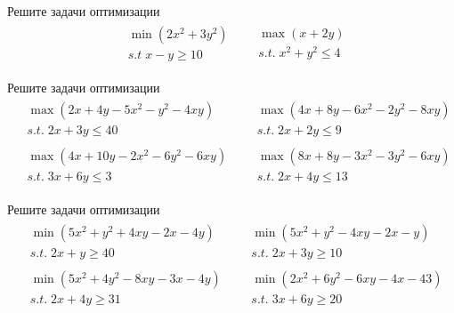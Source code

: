 
\begin{exercise}
Решите задачи оптимизации
\begin{align*}
	&\begin{gathered}
		\min(2x^2+3y^2) \\  s.t\; x-y\geq 10
	\end{gathered} &
	&\begin{gathered}
		\max (x+2y) \\ s.t.\; x^2+y^2\leq4
	\end{gathered}
\end{align*}
\end{exercise}

\begin{exercise}
Решите задачи оптимизации
\begin{align*}
	&\begin{gathered}
		\max(2x+4y-5x^2-y^2-4xy)\\ s.t.\; 2x+3y\leq 40
	\end{gathered} &
	&\begin{gathered}
		\max(4x+8y-6x^2-2y^2-8xy)\\ s.t.\; 2x+2y\leq 9
	\end{gathered} \\
	&\begin{gathered}
		\max(4x+10y-2x^2-6y^2-6xy)\\ s.t.\; 3x+6y\leq 3
	\end{gathered} &
	&\begin{gathered}
		\max(8x+8y-3x^2-3y^2-6xy)\\ s.t.\; 2x+4y\leq 13
	\end{gathered}
\end{align*}
\end{exercise}

\begin{exercise}
Решите задачи оптимизации
\begin{align*}
	&\begin{gathered}
		\min(5x^2+y^2+4xy-2x-4y)\\ s.t.\; 2x+y\geq 40
	\end{gathered} &
	&\begin{gathered}
		\min(5x^2+y^2-4xy-2x-y)\\ s.t.\; 2x+3y\geq 10
	\end{gathered} \\
	&\begin{gathered}
		\min(5x^2+4y^2-8xy-3x-4y)\\ s.t.\; 2x+4y\geq 31
	\end{gathered} &
	&\begin{gathered}
		\min(2x^2+6y^2-6xy-4x-43)\\ s.t.\; 3x+6y\geq 20
	\end{gathered}
\end{align*}
\end{exercise}

